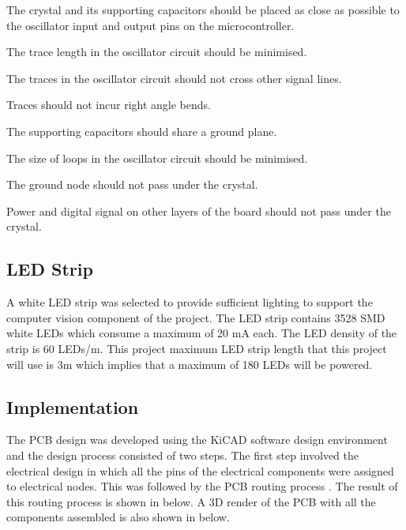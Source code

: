 \begin{compactitem}
	\item The crystal and its supporting capacitors should be placed as close as possible to the oscillator input and output pins on the microcontroller.
	\item The trace length in the oscillator circuit should be minimised.
	\item The traces in the oscillator circuit should not cross other signal lines.
	\item Traces should not incur right angle bends.
	\item The supporting capacitors should share a ground plane.
	\item The size of loops in the oscillator circuit should be minimised.
	\item The ground node should not pass under the crystal.
	\item Power and digital signal on other layers of the board should not pass under the crystal. 
\end{compactitem}

\subsection{LED Strip}

A white \ac{LED} strip was selected to provide sufficient lighting to support the computer vision component of the project. The \ac{LED} strip contains 3528 \ac{SMD} white LEDs which consume a maximum of 20 mA each. The \ac{LED} density of the strip is 60 LEDs/m. This project maximum LED strip length that this project will use is 3m which implies that a maximum of 180 LEDs will be powered.

\subsection{Implementation}

The PCB design was developed using the KiCAD software design environment and the design process consisted of two steps. The first step involved the electrical design in which all the pins of the electrical components were assigned to electrical nodes. This was followed by the PCB routing process . The result of this routing process is shown in  below. A 3D render of the PCB with all the components assembled is also shown in  below.

